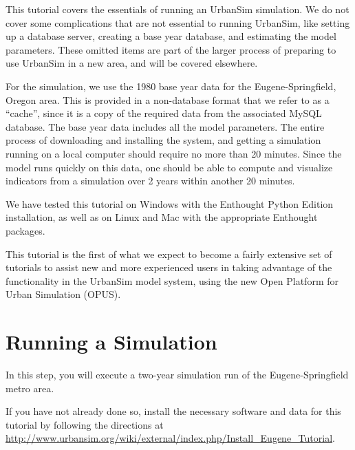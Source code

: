\documentclass{howto}
\begin{document}
This tutorial covers the essentials of running an UrbanSim simulation.
We do not cover some complications that are not essential to running
UrbanSim, like setting up a database server, creating a base year database, and
estimating the model parameters.  These omitted items are part of the larger
process of preparing to use UrbanSim in a new area, and will be covered
elsewhere.

For the simulation, we use the 1980 base year data for the
Eugene-Springfield, Oregon area.  This is provided in a non-database
format that we refer to as a ``cache'', since it is a copy of the
required data from the associated MySQL database. The base year data
includes all the model parameters.  The entire process of
downloading and installing the system, and getting a simulation
running on a local computer should require no more than 20 minutes.
Since the model runs quickly on this data, one should be able to
compute and visualize indicators from a simulation over 2 years
within another 20 minutes.

We have tested this tutorial on Windows with the Enthought Python Edition
installation, as well as on Linux and Mac with the appropriate Enthought
packages.

This tutorial is the first of what we expect to become a fairly extensive
set of tutorials to assist new and more experienced users in taking
advantage of the functionality in the UrbanSim model system, using
the new Open Platform for Urban Simulation (OPUS).


\section*{Running a Simulation}

In this step, you will execute a two-year simulation run of the
Eugene-Springfield metro area.

If you have not already done so, install the necessary software and
data for this tutorial by following the directions at
\url{http://www.urbansim.org/wiki/external/index.php/Install_Eugene_Tutorial}. 
\end{document}
